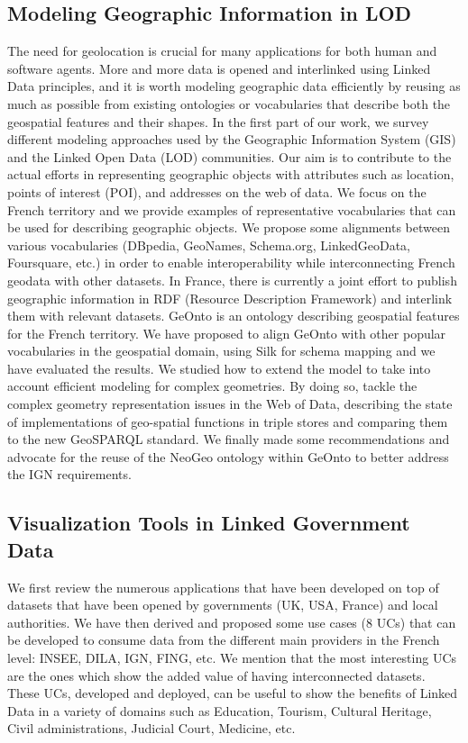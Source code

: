 \subsection{Modeling Geographic Information in LOD} \label{model}
The need for geolocation is crucial for many applications for both human and software agents. More and more data is opened and interlinked using Linked Data principles, and it is worth modeling geographic data efficiently by reusing as much as possible from existing ontologies or vocabularies that describe both the geospatial features and their shapes. In the first part of our work, we survey different modeling approaches used by the Geographic Information System (GIS) and the Linked Open Data (LOD) communities. Our aim is to contribute to the actual efforts in representing geographic objects with attributes such as location, points of interest (POI), and addresses on the web of data. We focus on the French territory and we provide examples of representative vocabularies that can be used for describing geographic objects. We propose some alignments between various vocabularies (DBpedia, GeoNames, Schema.org, LinkedGeoData, Foursquare, etc.) in order to enable interoperability while interconnecting French geodata with other datasets. In France, there is  currently a joint effort to publish geographic information in RDF (Resource Description Framework) and interlink them with relevant datasets. GeOnto is an ontology describing geospatial features for the French territory. We have proposed to align GeOnto with other popular vocabularies in the geospatial domain, using Silk for schema mapping and we have evaluated the results. We studied how to extend the model to take into account efficient modeling for complex geometries. By doing so, tackle the complex geometry representation issues in the Web of Data, describing the state of implementations of geo-spatial functions in triple stores and comparing them to the new GeoSPARQL standard.  We finally made some recommendations and advocate for the reuse of the NeoGeo ontology within GeOnto to better address the IGN requirements.

\subsection{Visualization Tools in Linked Government Data} \label{visu}

We first review the numerous applications that have been developed on top of datasets that have been opened by governments (UK, USA, France) and local authorities. We have then derived and proposed some use cases (8 UCs) that can be developed to consume data from the different main providers in the French level: INSEE, DILA, IGN, FING, etc. We mention that the most interesting UCs are the ones which show the added value of having interconnected datasets. These UCs,  developed and deployed, can be useful to show the benefits of Linked Data in a variety of domains such as Education, Tourism, Cultural Heritage, Civil administrations, Judicial Court, Medicine, etc. 

